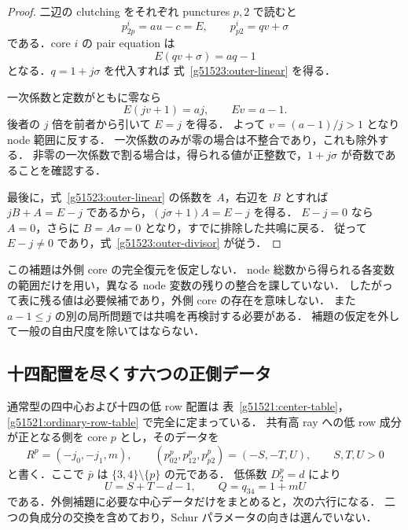 \begin{proof}
二辺の clutching をそれぞれ punctures $p,2$ で読むと
\[
 p^i_{2p}=a u-c=E,\qquad
 p^i_{p2}=qv+\sigma
\]
である．core $i$ の pair equation は
\begin{equation}\label{g51523:outer-original}
 E(qv+\sigma)=aq-1
\end{equation}
となる．$q=1+j\sigma$ を代入すれば
式~\eqref{g51523:outer-linear} を得る．

一次係数と定数がともに零なら
\[
 E(jv+1)=aj,\qquad Ev=a-1.
\]
後者の $j$ 倍を前者から引いて $E=j$ を得る．
よって $v=(a-1)/j>1$ となり node 範囲に反する．
一次係数のみが零の場合は不整合であり，これも除外する．
非零の一次係数で割る場合は，得られる値が正整数で，$1+j\sigma$ が奇数であることを確認する．

最後に，式~\eqref{g51523:outer-linear} の係数を $A$，右辺を $B$ とすれば
$jB+A=E-j$ であるから，$(j\sigma+1)A=E-j$ を得る．
$E-j=0$ なら $A=0$，さらに $B=A\sigma=0$ となり，すでに排除した共鳴に戻る．
従って $E-j\ne0$ であり，式~\eqref{g51523:outer-divisor} が従う．
\end{proof}

この補題は外側 core の完全復元を仮定しない．
node 総数から得られる各変数の範囲だけを用い，異なる node 変数の残りの整合を課していない．
したがって表に残る値は必要候補であり，外側 core の存在を意味しない．
また $a-1\le j$ の別の局所問題では共鳴を再検討する必要がある．
補題の仮定を外して一般の自由尺度を除いてはならない．

\subsection{十四配置を尽くす六つの正側データ}

通常型の四中心および十四の低 row 配置は
表~\ref{g51521:center-table}，\ref{g51521:ordinary-row-table} で完全に定まっている．
共有高 ray への低 row 成分が正となる側を core $p$ とし，そのデータを
\[
 R^p=(-j_0,-j_1,m),\qquad
 (p^p_{02},p^p_{12},p^p_{\bar p2})=(-S,-T,U),
 \qquad S,T,U>0
\]
と書く．ここで $\bar p$ は $\{3,4\}\setminus\{p\}$ の元である．
低係数 $D^p_2=d$ により
\begin{equation}\label{g51523:positive-column}
 U=S+T-d-1,\qquad Q=q_{34}=1+mU
\end{equation}
である．外側補題に必要な中心データだけをまとめると，次の六行になる．
二つの負成分の交換を含めており，Schur パラメータの向きは選んでいない．

